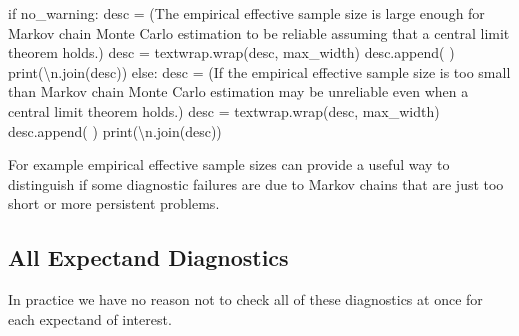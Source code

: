 \documentclass[
  letterpaper,
  DIV=11,
  numbers=noendperiod]{scrartcl}
\newenvironment{Shaded}{\begin{snugshade}}{\end{snugshade}}
\newcommand{\BuiltInTok}[1]{\textcolor[rgb]{0.00,0.23,0.31}{#1}}
\newcommand{\CharTok}[1]{\textcolor[rgb]{0.13,0.47,0.30}{#1}}
\newcommand{\ControlFlowTok}[1]{\textcolor[rgb]{0.00,0.23,0.31}{#1}}
\newcommand{\NormalTok}[1]{\textcolor[rgb]{0.00,0.23,0.31}{#1}}
\newcommand{\OperatorTok}[1]{\textcolor[rgb]{0.37,0.37,0.37}{#1}}
\newcommand{\StringTok}[1]{\textcolor[rgb]{0.13,0.47,0.30}{#1}}
\begin{document}
\begin{Shaded}
\begin{Highlighting}[]
  \ControlFlowTok{if}\NormalTok{ no\_warning:}
\NormalTok{    desc }\OperatorTok{=}\NormalTok{ (}\StringTok{\textquotesingle{}The empirical effective sample size is large enough for \textquotesingle{}}
            \StringTok{\textquotesingle{}Markov chain Monte Carlo estimation to be reliable \textquotesingle{}}
            \StringTok{\textquotesingle{}assuming that a central limit theorem holds.\textquotesingle{}}\NormalTok{)}
\NormalTok{    desc }\OperatorTok{=}\NormalTok{ textwrap.wrap(desc, max\_width)}
\NormalTok{    desc.append(}\StringTok{\textquotesingle{} \textquotesingle{}}\NormalTok{)}
    \BuiltInTok{print}\NormalTok{(}\StringTok{\textquotesingle{}}\CharTok{\textbackslash{}n}\StringTok{\textquotesingle{}}\NormalTok{.join(desc))}
  \ControlFlowTok{else}\NormalTok{:}
\NormalTok{    desc }\OperatorTok{=}\NormalTok{ (}\StringTok{\textquotesingle{}If the empirical effective sample size is too small than \textquotesingle{}}
            \StringTok{\textquotesingle{}Markov chain Monte Carlo estimation may be unreliable \textquotesingle{}}
            \StringTok{\textquotesingle{}even when a central limit theorem holds.\textquotesingle{}}\NormalTok{)}
\NormalTok{    desc }\OperatorTok{=}\NormalTok{ textwrap.wrap(desc, max\_width)}
\NormalTok{    desc.append(}\StringTok{\textquotesingle{} \textquotesingle{}}\NormalTok{)}
    \BuiltInTok{print}\NormalTok{(}\StringTok{\textquotesingle{}}\CharTok{\textbackslash{}n}\StringTok{\textquotesingle{}}\NormalTok{.join(desc))}
\end{Highlighting}
\end{Shaded}

For example empirical effective sample sizes can provide a useful way to
distinguish if some diagnostic failures are due to Markov chains that
are just too short or more persistent problems.

\subsection{All Expectand Diagnostics}\label{all-expectand-diagnostics}

In practice we have no reason not to check all of these diagnostics at
once for each expectand of interest.
\end{document}
